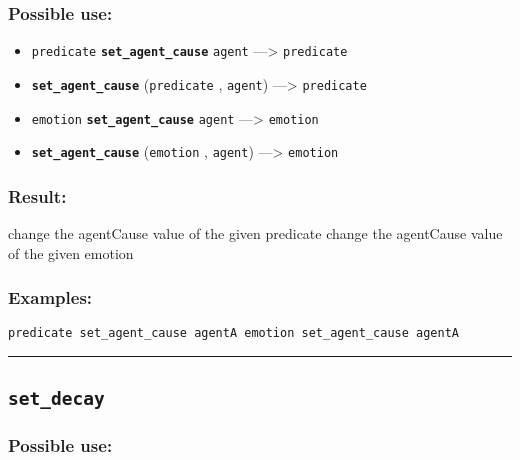 \documentclass[]{book}
\providecommand{\tightlist}{%
  \setlength{\itemsep}{0pt}\setlength{\parskip}{0pt}}
\theoremstyle{definition}
\theoremstyle{definition}
\theoremstyle{definition}
\theoremstyle{remark}
\begin{document}
\subsubsection{Possible use:}\label{possible-use-456}

\begin{itemize}
\tightlist
\item
  \texttt{predicate} \textbf{\texttt{set\_agent\_cause}} \texttt{agent}
  ---\textgreater{} \texttt{predicate}
\item
  \textbf{\texttt{set\_agent\_cause}} (\texttt{predicate} ,
  \texttt{agent}) ---\textgreater{} \texttt{predicate}
\item
  \texttt{emotion} \textbf{\texttt{set\_agent\_cause}} \texttt{agent}
  ---\textgreater{} \texttt{emotion}
\item
  \textbf{\texttt{set\_agent\_cause}} (\texttt{emotion} ,
  \texttt{agent}) ---\textgreater{} \texttt{emotion}
\end{itemize}

\subsubsection{Result:}\label{result-440}

change the agentCause value of the given predicate change the agentCause
value of the given emotion

\subsubsection{Examples:}\label{examples-313}

\begin{verbatim}
predicate set_agent_cause agentA emotion set_agent_cause agentA 
\end{verbatim}

\begin{center}\rule{0.5\linewidth}{\linethickness}\end{center}

\subsection{\texorpdfstring{\texttt{set\_decay}}{set\_decay}}\label{set_decay}

\subsubsection{Possible use:}\label{possible-use-457}
\end{document}
